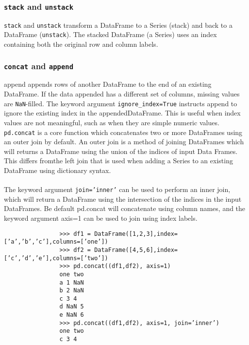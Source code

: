 \documentclass[KSmain.tex]{subfiles}
\begin{document}
	\subsubsection*{\texttt{stack} and \texttt{unstack}}
			\texttt{stack} and \texttt{unstack} transform a DataFrame to a Series (stack) and back to a DataFrame (\texttt{unstack}). The
			stacked DataFrame (a Series) uses an index containing both the original row and column labels.
			\subsubsection*{\texttt{concat} and \texttt{append}}
			append appends rows of another DataFrame to the end of an existing DataFrame. If the data appended
			has a different set of columns, missing values are \texttt{NaN}-filled. The keyword argument \texttt{ignore\_index=True}
			instructs append to ignore the existing index in the appendedDataFrame. This is useful when index values
			are not meaningful, such as when they are simple numeric values.\\
			
			\noindent \texttt{pd.concat} is a core function which concatenates two or more DataFrames using an outer join by default.
			An outer join is a method of joining DataFrames which will returns a DataFrame using the union of
			the indices of input Data Frames. This differs fromthe left join that is used when adding a Series to an existing
			DataFrame using dictionary syntax. \\ \\ The keyword argument \texttt{join=’inner’} can be used to perform an
			inner join, which will return a DataFrame using the intersection of the indices in the input DataFrames.
			Be default pd.concat will concatenate using column names, and the keyword argument axis=1 can be
			used to join using index labels.
			\begin{framed}
				\begin{verbatim}
				>>> df1 = DataFrame([1,2,3],index=[’a’,’b’,’c’],columns=[’one’])
				>>> df2 = DataFrame([4,5,6],index=[’c’,’d’,’e’],columns=[’two’])
				>>> pd.concat((df1,df2), axis=1)
				one two
				a 1 NaN
				b 2 NaN
				c 3 4
				d NaN 5
				e NaN 6
				>>> pd.concat((df1,df2), axis=1, join=’inner’)
				one two
				c 3 4
				\end{verbatim}
			\end{framed}
\end{document}
